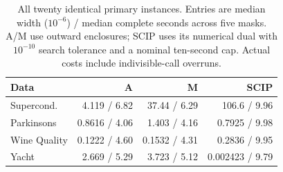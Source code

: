 \begin{table}[t]\centering\small\setlength{\tabcolsep}{3pt}
\caption{All twenty identical primary instances. Entries are median width ($10^{-6}$) / median complete seconds across five masks. A/M use outward enclosures; SCIP uses its numerical dual with $10^{-10}$ search tolerance and a nominal ten-second cap. Actual costs include indivisible-call overruns.}
\label{tab:external-main-v90}
\begin{tabular}{lrrr}\toprule Data&A&M&SCIP\\\midrule
Supercond. & 4.119 / 6.82 & 37.44 / 6.29 & 106.6 / 9.96\\
Parkinsons & 0.8616 / 4.06 & 1.403 / 4.16 & 0.7925 / 9.98\\
Wine Quality & 0.1222 / 4.60 & 0.1532 / 4.31 & 0.2836 / 9.95\\
Yacht & 2.669 / 5.29 & 3.723 / 5.12 & 0.002423 / 9.79\\
\bottomrule\end{tabular}\end{table}

